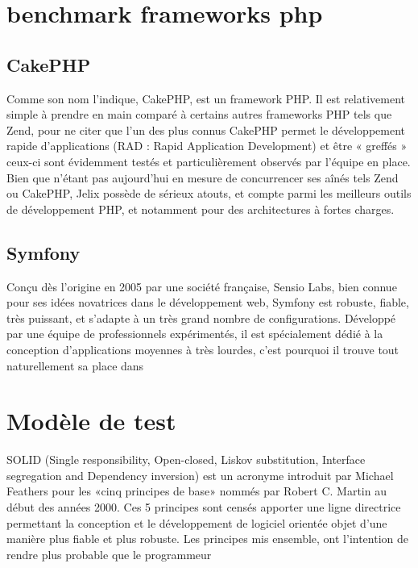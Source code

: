 \chapter{benchmark frameworks php}
  \section*{CakePHP}
    Comme son nom l’indique, CakePHP, est un framework PHP. Il est relativement simple à prendre en main comparé à certains autres frameworks PHP tels que Zend, pour ne citer que l’un des plus connus
    CakePHP permet le développement rapide d’applications (RAD : Rapid Application Development) et être « greffés » ceux-ci sont évidemment testés et particulièrement observés par l’équipe en place.
    Bien que n’étant pas aujourd’hui en mesure de concurrencer ses aînés tels Zend ou CakePHP, Jelix possède de sérieux atouts, et compte parmi les meilleurs outils de développement PHP, et notamment pour des architectures à fortes charges.
  \section*{Symfony}
    Conçu dès l’origine en 2005 par une société française, Sensio Labs, bien connue pour ses idées novatrices dans le développement web, Symfony est robuste, fiable, très puissant, et s’adapte à un très grand nombre de configurations.
    Développé par une équipe de professionnels expérimentés, il est spécialement dédié à la conception d’applications moyennes à très lourdes, c’est pourquoi il trouve tout naturellement sa place dans 

\chapter{Modèle de test}
  SOLID (Single responsibility, Open-closed, Liskov substitution, Interface segregation and Dependency inversion) est un acronyme introduit par Michael Feathers pour les «cinq principes de base» nommés par Robert C. Martin au début des années 2000. Ces 5 principes sont censés apporter une ligne directrice permettant la conception et le développement de logiciel orientée objet d'une manière plus fiable et plus robuste. Les principes mis ensemble, ont l'intention de rendre plus probable que le programmeur 